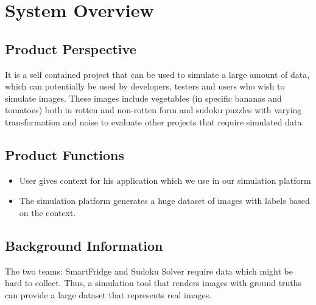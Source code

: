 \documentclass[a4paper,12pt]{article}
\begin{document}
\newpage
\section{System Overview}
\subsection{Product Perspective}
It is a self contained project that can be used to simulate a large amount of data, which can potentially be used by developers, testers and users who wish to simulate images. These images include vegetables (in specific bananas and tomatoes) both in rotten and non-rotten form and sudoku puzzles with varying transformation and noise to evaluate other projects that require simulated data.

\subsection{Product Functions}
\begin{itemize}
\item User gives context for his application which we use in our simulation platform
\item The simulation platform generates a huge dataset of images with labels based on the context.
\end{itemize}
\subsection{Background Information}
The two teams: SmartFridge and Sudoku Solver require data which might be hard to collect. Thus, a simulation tool that renders images with ground truths can provide a large dataset that represents real images.
\end{document}
